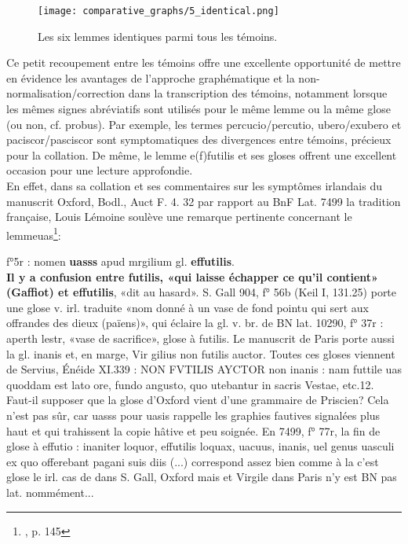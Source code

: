 \documentclass[a4paper, twoside, 12pt]{book}
\begin{document}
{\begin{figure}[H]
    \texttt{[image: comparative\_graphs/5\_identical.png]}
    \caption{Les six lemmes \og{}identiques\fg{} parmi tous les témoins.}
\end{figure}


Ce petit recoupement entre les témoins offre une excellente opportunité de mettre en évidence les avantages de l'approche graphématique et la non-normalisation/correction dans la transcription des témoins, notamment lorsque les mêmes signes abréviatifs sont utilisés pour le même lemme ou la même glose (ou non, cf. \og{}probus\fg{}). Par exemple, les termes \og{}percucio/percutio\fg{}, \og{}ubero/exubero\fg{} et \og{}paciscor/pasciscor\fg{} sont symptomatiques des divergences entre témoins, précieux pour la collation. De même, le lemme \og{}e(f)futilis\fg{} et ses gloses offrent une excellent occasion pour une lecture approfondie.\\

En effet, dans sa collation et ses commentaires sur les symptômes irlandais du manuscrit Oxford, Bodl., Auct F. 4. 32 par rapport au BnF Lat. 7499 la \og{}tradition française\fg{}, Louis Lémoine soulève une remarque pertinente concernant le lemme\og{}uas\fg{}\footnote{\cite{lemoine1989symptomes}, p. 145}:

\og{}f°5r : nomen \textbf{uasss} apud mrgilium gl. \textbf{effutilis}.\\

\textbf{Il y a confusion entre futilis, «qui laisse échapper ce qu’il contient» (Gaffiot) et effutilis}, «dit au hasard». S. Gall 904, f° 56b (Keil I, 131.25) porte une glose v. irl. traduite «nom donné à un vase de fond pointu qui sert aux offrandes des dieux (païens)», qui éclaire la gl. v. br. de BN lat. 10290, f° 37r : aperth lestr, «vase de sacrifice», glose à futilis. Le manuscrit de Paris porte aussi la gl. inanis et, en marge, Vir gilius non futilis auctor. Toutes ces gloses viennent de Servius, Énéide XI.339 : NON FVTILIS AYCTOR non inanis : nam futtile uas quoddam est lato ore, fundo angusto, quo utebantur in sacris Vestae, etc.12. Faut-il supposer que la glose d’Oxford vient d’une grammaire de Priscien? Cela n’est pas sûr, car uasss pour uasis rappelle les graphies fautives signalées plus haut et qui trahissent la copie hâtive et peu soignée. En 7499, f° 77r, la fin de glose à effutio : inaniter loquor, effutilis loquax, uacuus, inanis, uel genus uasculi ex quo offerebant pagani suis diis (...) correspond assez bien comme à la c’est glose le irl. cas de dans S. Gall, Oxford mais et Virgile dans Paris n’y est BN pas lat. nommément...\fg{}\\

}
\end{document}
